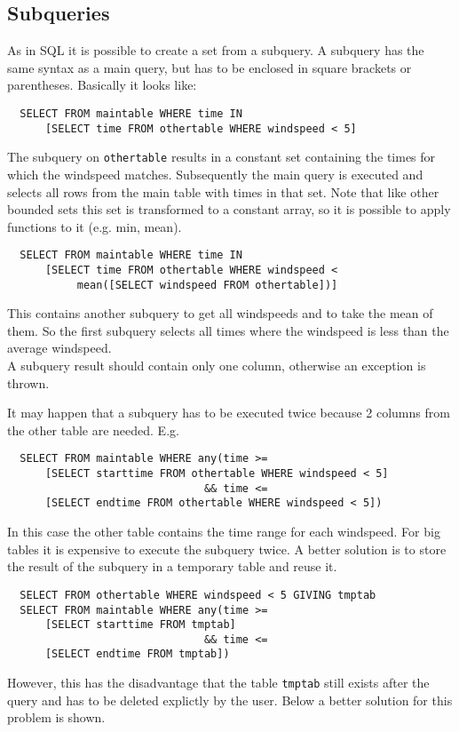 \subsection{\label{TAQL:SUBQUERIES}Subqueries}
As in SQL it is possible to create a set from a subquery. A
subquery has the same syntax as a main query, but has to be
enclosed in square brackets or parentheses. Basically it looks like:
\begin{verbatim}
  SELECT FROM maintable WHERE time IN
      [SELECT time FROM othertable WHERE windspeed < 5]
\end{verbatim}
The subquery on \texttt{othertable} results in a constant set
containing the times
for which the windspeed matches. Subsequently the main query
is executed and selects all rows from the main table with times in
that set.
Note that like other bounded sets this set is transformed to a
constant array, so it is possible to apply functions to it (e.g. min, mean).
\begin{verbatim}
  SELECT FROM maintable WHERE time IN
      [SELECT time FROM othertable WHERE windspeed <
           mean([SELECT windspeed FROM othertable])]
\end{verbatim}
This contains another subquery to get all windspeeds and
to take the mean of them. So the first subquery selects all times
where the windspeed is less than the average windspeed.
\\A subquery result should contain only one column, otherwise
an exception is thrown.

It may happen that a subquery has to be executed twice because
2 columns from the other table are needed. E.g.
\begin{verbatim}
  SELECT FROM maintable WHERE any(time >=
      [SELECT starttime FROM othertable WHERE windspeed < 5]
                               && time <=
      [SELECT endtime FROM othertable WHERE windspeed < 5])
\end{verbatim}
In this case the other table contains the time range for each windspeed.
For big tables it is expensive to execute the subquery twice.
A better solution
is to store the result of the subquery in a temporary table and reuse it.
\begin{verbatim}
  SELECT FROM othertable WHERE windspeed < 5 GIVING tmptab
  SELECT FROM maintable WHERE any(time >=
      [SELECT starttime FROM tmptab]
                               && time <=
      [SELECT endtime FROM tmptab])
\end{verbatim}
However, this has the disadvantage that the table \texttt{tmptab}
still exists after the query and has to be deleted explictly by the
user. Below a better solution for this problem is shown.

